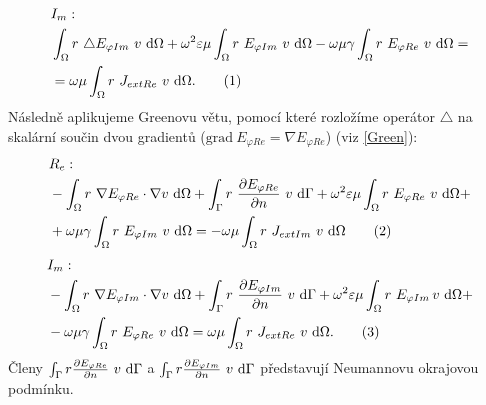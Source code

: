 \documentclass[12pt,a4paper,oneside]{article}
\numberwithin{equation}{section} %
\numberwithin{figure}{section} %
\numberwithin{table}{section} %
\newcommand{\grad}{\mathrm{grad}\ }
\newcommand\numberthis{\addtocounter{equation}{1}\tag{\theequation}}
\begin{document}
\begin{align*}
&I_m:
\\
&\int _{\Omega} r ~ \triangle E _{\varphi Im} ~ v ~ \ud \Omega + \omega ^2 \varepsilon \mu \int _{\Omega} r ~ E _{\varphi Im} ~ v ~ \ud \Omega - \omega \mu \gamma \int _{\Omega} r ~ E _{\varphi Re} ~ v ~ \ud \Omega =\\ 
&= \omega \mu \int _{\Omega} r ~ J _{extRe} ~ v ~ \ud \Omega .
\numberthis
\end{align*}
Následně aplikujeme Greenovu větu, pomocí které rozložíme operátor $\triangle$ na skalární součin dvou gradientů ($\grad E _{\varphi Re} = \nabla E _{\varphi Re}$) (viz \ref{Green}):
\begin{align*}
&R_e:
\\
&- \int _{\Omega} r ~ \nabla E _{\varphi Re} \cdot \nabla v ~ \ud \Omega + \int _{\Gamma} r ~ \frac{\partial E _{\varphi Re}}{\partial n} ~ v ~ \ud \Gamma + \omega ^2 \varepsilon \mu \int _{\Omega} r ~ E _{\varphi Re} ~ v ~ \ud \Omega +\\
& + \omega \mu \gamma \int _{\Omega} r ~ E _{\varphi Im} ~ v ~ \ud \Omega = - \omega \mu \int _{\Omega} r ~ J _{extIm} ~ v ~ \ud \Omega
\numberthis
\end{align*}
\begin{align*}
&I_m:
\\
&- \int _{\Omega} r ~ \nabla E _{\varphi Im} \cdot \nabla v ~ \ud \Omega + \int _{\Gamma} r ~ \frac{\partial E _{\varphi Im}}{\partial n} ~ v ~ \ud \Gamma + \omega ^2 \varepsilon \mu \int _{\Omega} r ~ E _{\varphi Im} \! ~ v ~ \ud \Omega +\\ 
& - \omega \mu \gamma \int _{\Omega} r ~ E _{\varphi Re} ~ v ~ \ud \Omega = \omega \mu \int _{\Omega} r ~ J _{extRe} ~ v ~ \ud \Omega .
\numberthis
\end{align*}
Členy $\int _{\Gamma} r \frac{\partial E _{\varphi Re}}{\partial n} ~ v ~ \mathrm{d} \Gamma$ a $\int _{\Gamma} r \frac{\partial E _{\varphi Im}}{\partial n} ~ v ~ \mathrm{d} \Gamma$ představují Neumannovu okrajovou podmínku.
\end{document}
